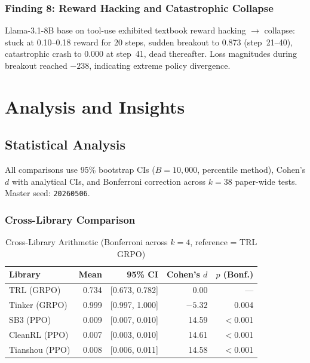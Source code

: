 \documentclass[12pt,a4paper]{report}
\theoremstyle{definition}
\begin{document}
\section{Finding 8: Reward Hacking and Catastrophic Collapse}
\label{sec:f8-collapse}

Llama-3.1-8B base on tool-use exhibited textbook reward hacking $\to$ collapse:
stuck at 0.10--0.18 reward for 20 steps, sudden breakout to 0.873 (step~21--40),
catastrophic crash to 0.000 at step~41, dead thereafter.
Loss magnitudes during breakout reached $-238$, indicating extreme policy divergence.



\part{Analysis and Insights}


\chapter{Statistical Analysis}
\label{ch:statistics}

All comparisons use 95\% bootstrap CIs ($B=10{,}000$, percentile method), Cohen's $d$ with analytical CIs,
and Bonferroni correction across $k=38$ paper-wide tests. Master seed: \texttt{20260506}.

\section{Cross-Library Comparison}
\label{sec:cross-lib-stats}

\begin{table}[htbp]
\centering
\caption{Cross-Library Arithmetic (Bonferroni across $k=4$, reference = TRL GRPO)}
\label{tab:cross-lib}
\begin{tabular}{lrrrr}
\toprule
\textbf{Library} & \textbf{Mean} & \textbf{95\% CI} & \textbf{Cohen's $d$} & \textbf{$p$ (Bonf.)} \\
\midrule
TRL (GRPO) & 0.734 & [0.673, 0.782] & 0.00 & --- \\
Tinker (GRPO) & 0.999 & [0.997, 1.000] & $-5.32$ & 0.004 \\
SB3 (PPO) & 0.009 & [0.007, 0.010] & 14.59 & $<$0.001 \\
CleanRL (PPO) & 0.007 & [0.003, 0.010] & 14.61 & $<$0.001 \\
Tianshou (PPO) & 0.008 & [0.006, 0.011] & 14.58 & $<$0.001 \\
\bottomrule
\end{tabular}
\end{table}
\end{document}
